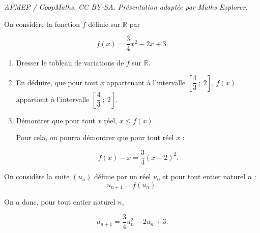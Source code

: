 \documentclass[10pt]{article}
\providecommand{\R}{\mathbb{R}}
\begin{document}
\noindent\textit{APMEP / CoopMaths. CC BY-SA. Présentation adaptée par Maths Explorer.}\par\medskip
\medskip

On considère la fonction $f$ définie sur $\R$ par 

\[f(x) = \dfrac34 x^2 - 2x + 3.\]

\begin{enumerate}
\item Dresser le tableau de variations de $f$ sur $\R$.
\item En déduire, que pour tout $x$ appartenant à l'intervalle $\left[\dfrac43~;~2\right]$,\: $f(x)$ appartient à l'intervalle $\left[\dfrac43~;~2\right]$.
\item Démontrer que pour tout $x$ réel, $x \leqslant f(x)$.

Pour cela, on pourra démontrer que pour tout réel $x$ :

\[f(x) - x = \dfrac34(x - 2)^2.\]

\end{enumerate}

On considère la suite $\left(u_n\right)$ définie par un réel $u_0$ et pour tout entier naturel $n$ :
\[u_{n+1} = f\left(u_n\right).\]

On a donc, pour tout entier naturel $n$,

\[u_{n+1} = \dfrac34 u_n^2 - 2u_n + 3.\]
\end{document}
